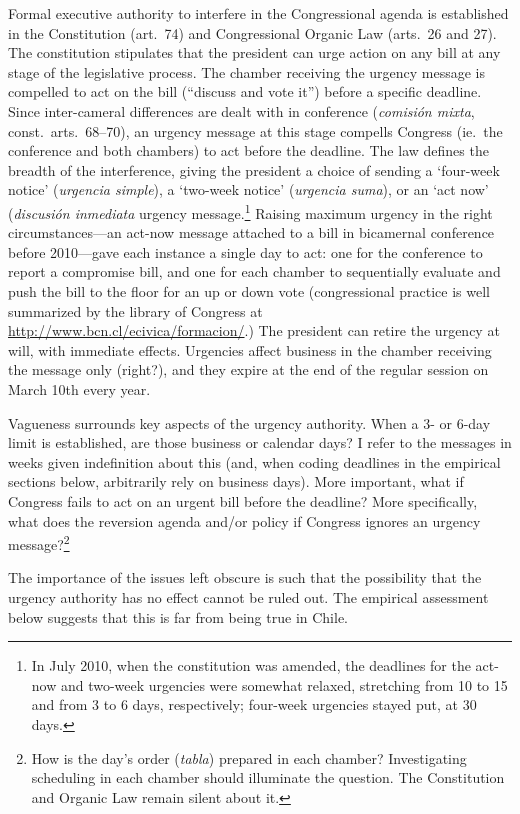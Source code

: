 \documentclass[letter,12pt]{article}
\begin{document}
Formal executive authority to interfere in the Congressional agenda is established in the Constitution (art.\ 74) and Congressional Organic Law (arts.\ 26 and 27). The constitution stipulates that the president can urge action on any bill at any stage of the legislative process. The chamber receiving the urgency message is compelled to act on the bill (``discuss and vote it'') before a specific deadline. Since inter-cameral differences are dealt with in conference (\emph{comisión mixta}, const.\ arts.\ 68--70), an urgency message at this stage compells Congress (ie.\ the conference and both chambers) to act before the deadline. The law defines the breadth of the interference, giving the president a choice of sending a `four-week notice' (\emph{urgencia simple}), a `two-week notice' (\emph{urgencia suma}), or an `act now' (\emph{discusión inmediata} urgency message.\footnote{In July 2010, when the constitution was amended, the deadlines for the act-now and two-week urgencies were somewhat relaxed, stretching from 10 to 15 and from 3 to 6 days, respectively; four-week urgencies stayed put, at 30 days.} Raising maximum urgency in the right circumstances---an act-now message attached to a bill in bicamernal conference before 2010---gave each instance a single day to act: one for the conference to report a compromise bill, and one for each chamber to sequentially evaluate and push the bill to the floor for an up or down vote (congressional practice is well summarized by the library of Congress at \url{http://www.bcn.cl/ecivica/formacion/}.) The president can retire the urgency at will, with immediate effects. Urgencies affect business in the chamber receiving the message only (right?), and they expire at the end of the regular session on March 10th every year. 

Vagueness surrounds key aspects of the urgency authority. When a 3- or 6-day limit is established, are those business or calendar days? I refer to the messages in weeks given indefinition about this (and, when coding deadlines in the empirical sections below, arbitrarily rely on business days). More important, what if Congress fails to act on an urgent bill before the deadline? More specifically, what does the reversion agenda and/or policy if Congress ignores an urgency message?\footnote{How is the day's order (\emph{tabla}) prepared in each chamber? Investigating scheduling in each chamber should illuminate the question. The Constitution and Organic Law remain silent about it.} 

The importance of the issues left obscure is such that the possibility that the urgency authority has no effect cannot be ruled out. The empirical assessment below suggests that this is far from being true in Chile. 
\end{document}
